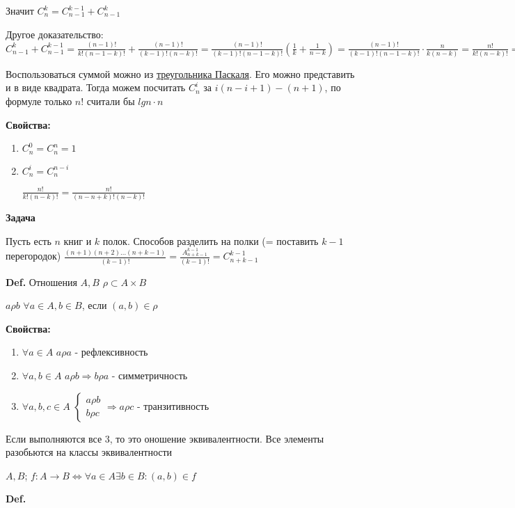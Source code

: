 \documentclass[14pt, letter paper]{article}
\begin{document}
Значит $C_n^k = C_{n-1}^{k-1} + C_{n-1}^k$

Другое доказательство: $C_{n-1}^k + C_{n-1}^{k-1} = \frac{(n-1)!}{k!(n-1-k)!} + \frac{(n-1)!}{(k-1)!(n-k)!} = \frac{(n-1)!}{(k-1)!(n-1-k)!}(\frac{1}{k} + \frac{1}{n-k}) = \frac{(n-1)!}{(k-1)!(n-1-k)!} \cdot \frac{n}{k(n-k)} = \frac{n!}{k!(n-k)!} = C_n^k$

Воспользоваться суммой можно из \href{https://ptri1.tripod.com/ptreal1r.gif}{треугольника Паскаля}. Его можно представить и в виде квадрата. Тогда можем посчитать $C_n^i$ за $i(n-i+1) - (n+1)$, по формуле только $n!$ считали бы $lgn \cdot n$

\textbf{Свойства:}
\begin{enumerate}
    \item $C_n^0 = C_n^n = 1$
    \item $C_n^i = C_n^{n-i}$

    $\frac{n!}{k!(n-k)!} = \frac{n!}{(n-n+k)!(n-k)!}$
\end{enumerate}

\textbf{Задача}

Пусть есть $n$ книг и $k$ полок. Способов разделить на полки (= поставить $k-1$ перегородок) $\frac{(n+1)(n+2) \ldots (n+k-1)}{(k-1)!} = \frac{A_{n+k-1}^{k-1}}{(k-1)!} = C_{n+k-1}^{k-1}$

\textbf{Def.} Отношения $A, B$ $\rho \subset A \times B$ 

$a \rho b$ $\forall a \in A, b \in B$, если $(a, b) \in \rho$

\textbf{Свойства:}

\begin{enumerate}
    \item $\forall a \in A$ $a \rho a$ - рефлексивность
    \item $\forall a, b \in A$ $a \rho b \Rightarrow b \rho a$ - симметричность
    \item $\forall a, b, c \in A$ $\begin{cases}
        a \rho b \\
        b \rho c
    \end{cases} \Rightarrow a \rho c$ - транзитивность
\end{enumerate}

Если выполняются все 3, то это оношение эквивалентности. Все элементы разобьются на классы эквивалентности

$A, B$; $f: A \rightarrow B \Leftrightarrow \forall a \in A \exists b \in B:(a, b) \in f$

\textbf{Def.}
\end{document}
